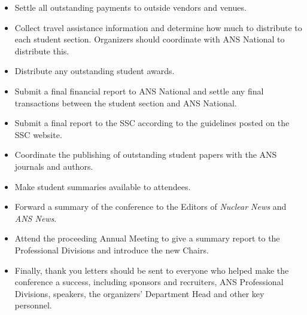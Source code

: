 \documentclass[12pt]{article}
\begin{document}
\begin{itemize}
    \item Settle all outstanding payments to outside vendors and venues.
    \item Collect travel assistance information and determine how much to distribute to each student section. Organizers should coordinate with ANS National to distribute this.
    \item Distribute any outstanding student awards.
    \item Submit a final financial report to ANS National and settle any final transactions between the student section and ANS National.
    \item Submit a final report to the SSC according to the guidelines posted on the SSC website.
    \item Coordinate the publishing of outstanding student papers with the ANS journals and authors.
    \item Make student summaries available to attendees.
    \item Forward a summary of the conference to the Editors of \textit{Nuclear News} and \textit{ANS News}.
    \item Attend the proceeding Annual Meeting to give a summary report to the Professional Divisions and introduce the new Chairs.
    \item Finally, thank you letters should be sent to everyone who helped make the conference a success, including sponsors and recruiters, ANS Professional Divisions, speakers, the organizers' Department Head and other key personnel. 
\end{itemize}
\end{document}
